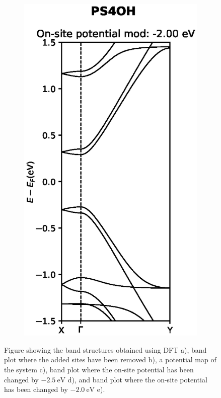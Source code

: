 \begin{figure}[h]
\begin{subfigure}[b]{0.25\textwidth}
    \vspace{-2.5\baselineskip}
    \caption{}
    \label{PS4OHmod1}
    \end{subfigure}
    ~
    \begin{subfigure}[b]{0.25\textwidth}
    \centering
    \includegraphics[width=\textwidth]{Figures/PS4OHmod2.eps}
    \vspace{-2.5\baselineskip}
    \caption{}
    \label{PS4OHdevmod2}
    \end{subfigure}
    \vspace{-1\baselineskip}
    \caption{Figure showing the band structures obtained using DFT a), band plot where the added sites have been removed b), a potential map of the system c), band plot where the on-site potential has been changed by \(\SI{-2.5}{\electronvolt}\) d), and band plot where the on-site potential has been changed by \(\SI{-2.0}{\electronvolt}\) e).}
    \label{PS4OH}
\end{figure}
